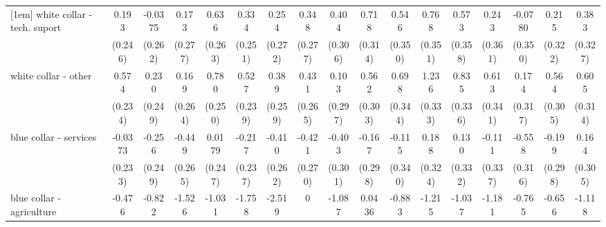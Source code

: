 {\begin{tabular}{l*{16}{c}}
[1em]
white collar - tech. suport&       0.193         &     -0.0375         &       0.173         &       0.636\sym{*}  &       0.334         &       0.254         &       0.348         &       0.404         &       0.718\sym{*}  &       0.546         &       0.768\sym{*}  &       0.573         &       0.243         &     -0.0780         &       0.215         &       0.383         \\
                    &     (0.246)         &     (0.262)         &     (0.277)         &     (0.263)         &     (0.251)         &     (0.272)         &     (0.277)         &     (0.306)         &     (0.314)         &     (0.350)         &     (0.351)         &     (0.358)         &     (0.361)         &     (0.350)         &     (0.322)         &     (0.327)         \\
[1em]
white collar - other&       0.574\sym{*}  &       0.230         &       0.169         &       0.780\sym{**} &       0.527\sym{*}  &       0.389         &       0.431         &       0.103         &       0.562         &       0.698\sym{*}  &       1.236\sym{***}&       0.835\sym{*}  &       0.613         &       0.174         &       0.564         &       0.605         \\
                    &     (0.234)         &     (0.249)         &     (0.264)         &     (0.250)         &     (0.239)         &     (0.259)         &     (0.265)         &     (0.297)         &     (0.303)         &     (0.344)         &     (0.333)         &     (0.336)         &     (0.341)         &     (0.317)         &     (0.305)         &     (0.314)         \\
[1em]
blue collar - services&     -0.0373         &      -0.256         &      -0.449         &      0.0179         &      -0.217         &      -0.410         &      -0.421         &      -0.403         &      -0.167         &      -0.115         &       0.188         &       0.130         &      -0.111         &      -0.558         &      -0.199         &       0.164         \\
                    &     (0.233)         &     (0.249)         &     (0.265)         &     (0.247)         &     (0.237)         &     (0.262)         &     (0.270)         &     (0.301)         &     (0.298)         &     (0.340)         &     (0.324)         &     (0.332)         &     (0.337)         &     (0.316)         &     (0.298)         &     (0.305)         \\
[1em]
blue collar - agriculture&      -0.476         &      -0.822         &      -1.526\sym{*}  &      -1.031         &      -1.758\sym{*}  &      -2.519\sym{*}  &           0         &      -1.087         &      0.0436         &      -0.883         &      -1.215         &      -1.037         &      -1.181         &      -0.765         &      -0.656         &      -1.118         \\

\end{tabular}}
